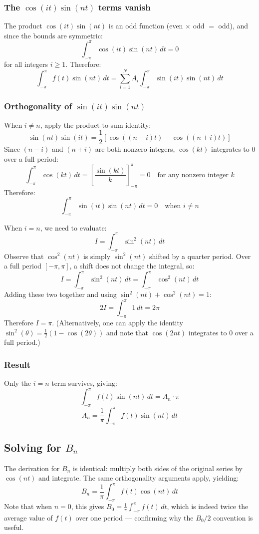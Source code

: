 \documentclass[]{article}
\begin{document}
\subsubsection*{The $\cos(it)\sin(nt)$ terms vanish}
The product $\cos(it)\sin(nt)$ is an odd function (even $\times$ odd $=$ odd), and since the bounds are symmetric:
\[\int_{-\pi}^{\pi} \cos(it)\sin(nt)\,dt = 0\]
for all integers $i \geq 1$. Therefore:
\[\int_{-\pi}^{\pi} f(t)\sin(nt) \, dt = \sum_{i = 1}^{N}A_i  \int_{-\pi}^{\pi} \sin(it)\sin(nt)\,dt\]

\subsubsection*{Orthogonality of $\sin(it)\sin(nt)$}
When $i \neq n$, apply the product-to-sum identity:
\[\sin(nt)\sin(it) = \frac{1}{2}[\cos((n-i)t) - \cos((n+i)t)]\]
Since $(n-i)$ and $(n+i)$ are both nonzero integers, $\cos(kt)$ integrates to $0$ over a full period:
\[\int_{-\pi}^{\pi} \cos(kt)\,dt = \left[\frac{\sin(kt)}{k}\right]_{-\pi}^{\pi} = 0 \quad \text{for any nonzero integer } k\]
Therefore:
\[\int_{-\pi}^{\pi} \sin(it)\sin(nt)\,dt = 0 \quad \text{when } i \neq n\]

When $i = n$, we need to evaluate:
\[I = \int_{-\pi}^{\pi} \sin^2(nt)\,dt\]
Observe that $\cos^2(nt)$ is simply $\sin^2(nt)$ shifted by a quarter period. Over a full period $[-\pi, \pi]$, a shift does not change the integral, so:
\[I = \int_{-\pi}^{\pi} \sin^2(nt)\,dt = \int_{-\pi}^{\pi} \cos^2(nt)\,dt\]
Adding these two together and using $\sin^2(nt) + \cos^2(nt) = 1$:
\[2I = \int_{-\pi}^{\pi} 1\,dt = 2\pi\]
Therefore $I = \pi$. (Alternatively, one can apply the identity $\sin^2(\theta) = \frac{1}{2}(1 - \cos(2\theta))$ and note that $\cos(2nt)$ integrates to $0$ over a full period.)

\subsubsection*{Result}
Only the $i = n$ term survives, giving:
\[\int_{-\pi}^{\pi} f(t)\sin(nt) \, dt  = A_n \cdot \pi\]
\[A_n = \frac{1}{\pi}\int_{-\pi}^{\pi} f(t)\sin(nt) \, dt \]

\subsection{Solving for $B_n$}
The derivation for $B_n$ is identical: multiply both sides of the original series by $\cos(nt)$ and integrate. The same orthogonality arguments apply, yielding:
\[B_n = \frac{1}{\pi}\int_{-\pi}^{\pi} f(t)\cos(nt) \, dt \]
Note that when $n = 0$, this gives $B_0 = \frac{1}{\pi}\int_{-\pi}^{\pi} f(t)\,dt$, which is indeed twice the average value of $f(t)$ over one period --- confirming why the $B_0/2$ convention is useful.
\end{document}
